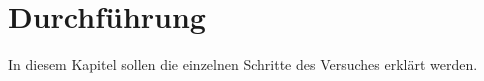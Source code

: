 \section{Durchführung}
\label{sec:Durchfuehrung}
In diesem Kapitel sollen die einzelnen Schritte des Versuches erklärt werden.
